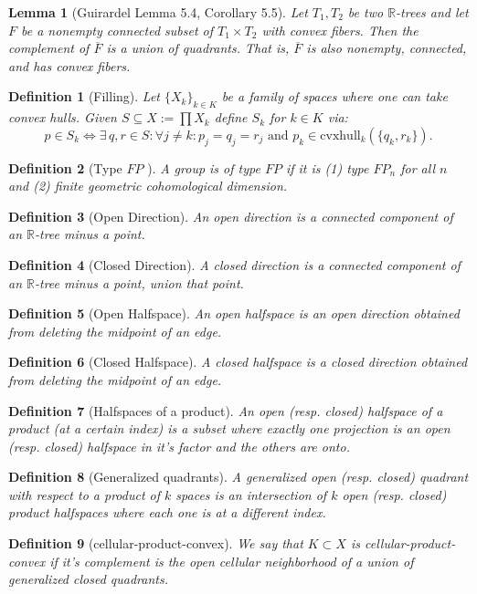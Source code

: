 \documentclass{article}
\theoremstyle{mystyle}
\newtheorem{lem}{Lemma}[section]
\newtheorem{defn}{Definition}[section]
\theoremstyle{remark}
\begin{document}
\begin{lem}
	[Guirardel Lemma 5.4, Corollary 5.5]
 \label{lem:guirardel} 
	Let \(T_{1} , T_{2}\) be two \(\mathbb{R}\)-trees and let \(F\) be a nonempty connected subset of \(T_{1} \times T_{2}\) with convex fibers. Then the complement of \(\overline{F}\) is a union of quadrants. That is, \(\overline{F}\) is also nonempty, connected, and has convex fibers.
\end{lem}

\begin{defn}
	[Filling]
    Let \(\{X_{k}\}_{k \in K}\) be a family of spaces where one can take convex hulls. Given \(S \subseteq X := \prod X_{k}\) define \(S_{k}\) for \(k \in K\) via: \[p \in S_{k} \iff \exists \,q,r \in S: \forall j \neq k: p_{j} = q_{j} = r_{j} \text{ and } p_{k} \in \text{cvxhull}_k (\{q_{k} , r_{k}\}).\] 
\end{defn}
\begin{defn}
	[Type \(FP\) ]
	A group is of type \(FP\) if it is (1) type \(FP_n\) for all \(n\) and (2) finite geometric cohomological dimension.
\end{defn}


\begin{defn}[Open Direction] An open direction is a connected component of an \(\mathbb{R}\)-tree minus a point. 
\end{defn}

\begin{defn}[Closed Direction] A closed direction is a connected component of an \(\mathbb{R}\)-tree minus a point, union that point.
\end{defn}
\begin{defn}[Open Halfspace] An open halfspace is an open direction obtained from deleting the midpoint of an edge.
\end{defn}
\begin{defn}[Closed Halfspace] A closed halfspace is a closed direction obtained from deleting the midpoint of an edge.
\end{defn}
\begin{defn}[Halfspaces of a product] An open (resp. closed) halfspace of a product (at a certain index) is a subset where exactly one projection is an open (resp. closed)  halfspace in it's factor and the others are onto.
\end{defn}
\begin{defn}[Generalized quadrants] A generalized open (resp. closed) quadrant with respect to a product of \(k\) spaces is an intersection of \(k\) open (resp. closed) product halfspaces where each one is at a different index.
\end{defn}
\begin{defn}[cellular-product-convex] We say that \(K \subset X\) is cellular-product-convex if it's complement is the open cellular neighborhood of a union of generalized closed quadrants.
\end{defn}
\end{document}
